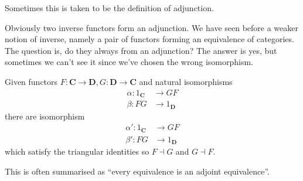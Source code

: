 \documentclass[a4paper]{article}
\renewcommand{\c}[1]{\mathbf{#1}}
\newcommand{\adjoint}{\dashv}
\begin{document}
Sometimes this is taken to be the definition of adjunction.

Obviously two inverse functors form an adjunction. We have seen before a weaker notion of inverse, namely a pair of functors forming an equivalence of categories. The question is, do they always from an adjunction? The answer is yes, but sometimes we can't see it since we've chosen the wrong isomorphism.

\begin{lemma}
  Given functors \(F: \c C \to \c D, G: \c D \to \c C\) and natural isomorphisms
  \begin{align*}
    \alpha: 1_{\c C} &\to GF \\
    \beta: FG &\to 1_{\c D}
  \end{align*}
  there are isomorphism
  \begin{align*}
    \alpha': 1_{\c C} &\to GF \\
    \beta': FG &\to 1_{\c D}
  \end{align*}
  which satisfy the triangular identities so \(F \adjoint G\) and \(G \adjoint F\).
\end{lemma}

This is often summarised as ``every equivalence is an adjoint equivalence''.
\end{document}
